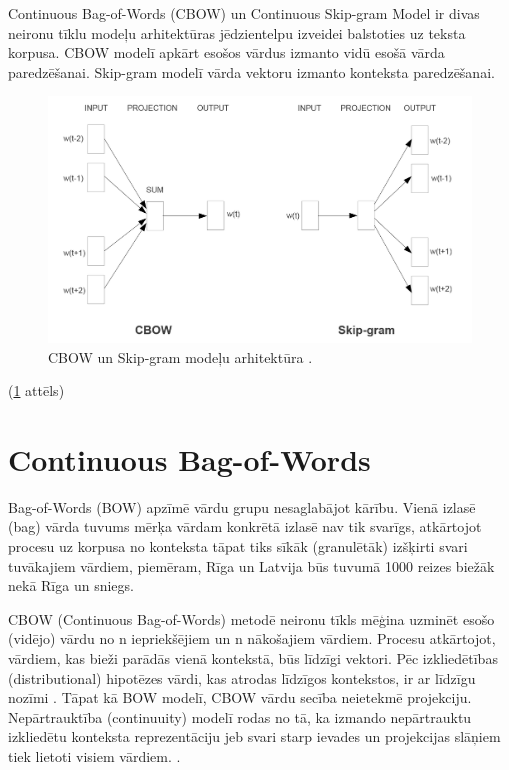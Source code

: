 Continuous Bag-of-Words (CBOW) un Continuous Skip-gram Model ir divas neironu tīklu modeļu arhitektūras jēdzientelpu izveidei balstoties uz teksta korpusa. CBOW modelī apkārt esošos vārdus izmanto vidū esošā vārda paredzēšanai. Skip-gram modelī vārda vektoru izmanto konteksta paredzēšanai.

\begin{figure}[h]
	\centering
	\includegraphics[width=\textwidth]{figures/word2vec-models.png}
	\caption{CBOW un Skip-gram modeļu arhitektūra \cite{word2vec2013}.}
	\label{fig:cbow-skipgram}
\end{figure}


(\ref{fig:cbow-skipgram} attēls)






\section{Continuous Bag-of-Words}

Bag-of-Words (BOW) apzīmē vārdu grupu nesaglabājot kārību. Vienā izlasē (bag) vārda tuvums mērķa vārdam konkrētā izlasē nav tik svarīgs, atkārtojot procesu uz korpusa no konteksta tāpat tiks sīkāk (granulētāk) izšķirti svari tuvākajiem vārdiem, piemēram, Rīga un Latvija būs tuvumā 1000 reizes biežāk nekā Rīga un sniegs.

CBOW (Continuous Bag-of-Words) metodē neironu tīkls mēģina uzminēt esošo (vidējo) vārdu no n iepriekšējiem un n nākošajiem vārdiem. Procesu atkārtojot, vārdiem, kas bieži parādās vienā kontekstā, būs līdzīgi vektori. Pēc izkliedētības (distributional) hipotēzes vārdi, kas atrodas līdzīgos kontekstos, ir ar līdzīgu nozīmi \cite{word2vec2013}. Tāpat kā BOW modelī, CBOW vārdu secība neietekmē projekciju. Nepārtrauktība (continuuity) modelī rodas no tā, ka izmando nepārtrauktu izkliedētu konteksta reprezentāciju
jeb svari starp ievades un projekcijas slāņiem tiek lietoti visiem vārdiem.
\cite{word2vec2013}.


